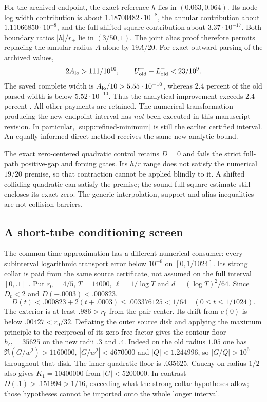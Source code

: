 For the archived endpoint, the exact reference $h$ lies in
$(0.063,0.064)$. Its node-log width contribution is about
$1.18700482\cdot10^{-8}$, the annular contribution about
$1.11066850\cdot10^{-8}$, and the full shifted-square contribution
about $3.37\cdot10^{-17}$. Both boundary ratios $|h|/r_\pm$
lie in $(3/50,1)$. The joint alias proof therefore permits replacing
the annular radius $A$ alone by $19A/20$.
For exact outward parsing of the archived values,
\[
 2A_{\rm lo}>111/10^{10},\qquad
 U_{\rm old}^{+}-L_{\rm old}^{-}<23/10^9.
\]
The saved complete width is $A_{\rm lo}/10>5.55\cdot10^{-10}$,
whereas 2.4 percent of the old parsed width is below
$5.52\cdot10^{-10}$. Thus the analytical improvement exceeds 2.4 percent
\cite{BakerCM52,BakerCMReview43}. All other payments are retained.
The numerical transformation producing the new endpoint interval has
\emph{not} been executed in this manuscript revision. In particular,
\eqref{supp:refined-minimum} is still the earlier certified interval.
An equally informed direct method receives the same new analytic bound.

The exact zero-centered quadratic control retains $D=0$ and fails the
strict full-path positive-gap and forcing gates. Its $h/r$ range does
not satisfy the numerical $19/20$ premise, so that contraction cannot
be applied blindly to it. A shifted colliding quadratic can satisfy the
premise; the sound full-square estimate still encloses its exact zero.
The generic interpolation, support and alias inequalities are not
collision barriers.

\subsection{A short-tube conditioning screen}
\label{supp:conditioning}

The common-time approximation has a different numerical consumer:
every-subinterval logarithmic transport error below $10^{-6}$ on
$[0,1/1024]$. Its strong collar is paid from the same source certificate,
not assumed on the full interval $[0,.1]$ \cite{BakerCM50,BakerCMReview41}.
Put $r_0=4/5$, $T=14000$, $\ell=1/\log T$ and
$d=(\log T)^2/64$. Since $D_t<2$ and
$D(-.0003)<.000823$,
\[
 D(t)<.000823+2(t+.0003)\le.003376125<1/64
 \quad(0\le t\le1/1024).
\]
The exterior is at least $.986>r_0$ from the pair center. Its drift
from $c(0)$ is below $.00427<r_0/32$. Deflating the outer source disk
and applying the maximum principle to the reciprocal of its zero-free
factor gives the contour floor $h_G=35625$ on the new radii $.3$ and $.4$.
Indeed on the old radius $1.05$ one has
$\Re(G/w^2)>1160000$, $|G/w^2|<4670000$ and
$|Q|<1.244996$, so $|G/Q|>10^6$ throughout that disk.
The inner quadratic floor is $.035625$. Cauchy on radius $1/2$ also gives
$K_1=10400000$ from $|G|<5200000$.
In contrast $D(.1)>.151994>1/16$, exceeding what the strong-collar
hypotheses allow; those hypotheses cannot be imported onto the whole
longer interval.

